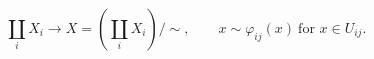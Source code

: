 \[\coprod_i X_i \longrightarrow X=(\coprod_i X_i)/{\sim},\qquad x\sim\varphi_{ij}(x)\ \text{for }x\in U_{ij}.\]

